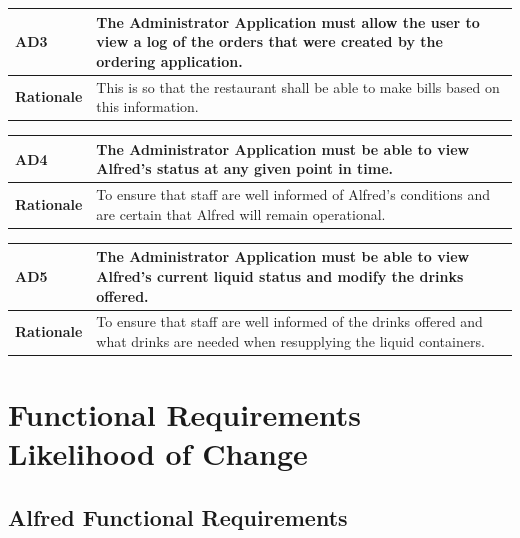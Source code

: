 \documentclass [11pt]{article}
\begin{document}
\begin{longtable}{| p{ } | p{ } | }\hline 
\rowcolor{tableCell}\textbf{AD3} & The Administrator Application must allow the user to view a log of the orders that were created by the ordering application. \\ \hline
\textbf{Rationale} &  This is so that the restaurant shall be able to make bills based on this information.\\ \hline 
\end{longtable}

\begin{longtable}{| p{ } | p{ } | }\hline 
\rowcolor{tableCell}\textbf{AD4} & The Administrator Application must be able to view Alfred's status at any given point in time. \\ \hline
\textbf{Rationale} &  To ensure that staff are well informed of Alfred's conditions and are certain that Alfred will remain operational. \\ \hline
\end{longtable}

\begin{longtable}{| p{ } | p{ } | }\hline 
\rowcolor{tableCell}\textbf{AD5} & The Administrator Application must be able to view Alfred's current liquid status and modify the drinks offered. \\ \hline
\textbf{Rationale} &  To ensure that staff are well informed of the drinks offered and what drinks are needed when resupplying the liquid containers. \\ \hline
\end{longtable}



\pagebreak
\section{Functional Requirements Likelihood of Change}

\subsection{Alfred Functional Requirements}
\end{document}
